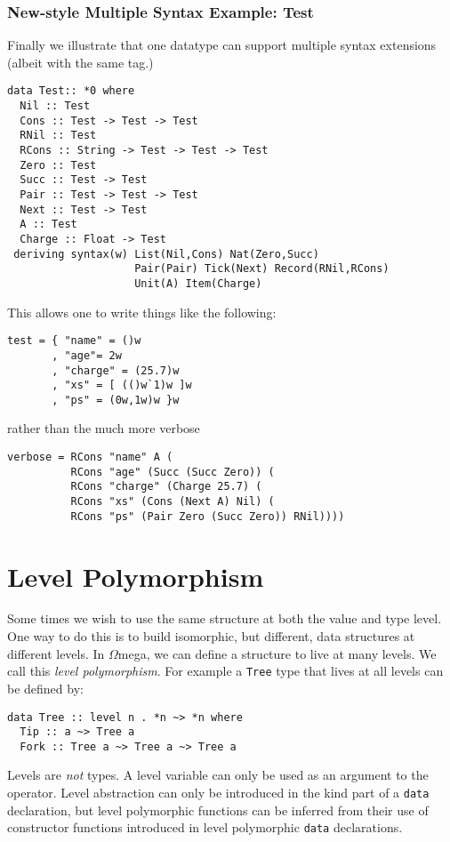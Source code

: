\documentclass[11pt,twoside]{article}
\newcommand{\om}{$\Omega$mega}
\begin{document}
\subsubsection{New-style Multiple Syntax Example: Test}

Finally we illustrate that one datatype can support multiple syntax extensions
(albeit with the same tag.)


\begin{verbatim}
data Test:: *0 where
  Nil :: Test
  Cons :: Test -> Test -> Test
  RNil :: Test
  RCons :: String -> Test -> Test -> Test
  Zero :: Test
  Succ :: Test -> Test
  Pair :: Test -> Test -> Test
  Next :: Test -> Test
  A :: Test
  Charge :: Float -> Test
 deriving syntax(w) List(Nil,Cons) Nat(Zero,Succ)
                    Pair(Pair) Tick(Next) Record(RNil,RCons)
                    Unit(A) Item(Charge)
\end{verbatim}
This allows one to write things like the following:

\begin{verbatim}
test = { "name" = ()w
       , "age"= 2w
       , "charge" = (25.7)w
       , "xs" = [ (()w`1)w ]w
       , "ps" = (0w,1w)w }w
\end{verbatim}
rather than the much more verbose
\begin{verbatim}
verbose = RCons "name" A (
          RCons "age" (Succ (Succ Zero)) (
          RCons "charge" (Charge 25.7) (
          RCons "xs" (Cons (Next A) Nil) (
          RCons "ps" (Pair Zero (Succ Zero)) RNil))))
\end{verbatim}




\section{Level Polymorphism}
Some times we wish to use the same structure at both the value and type level.
One way to do this is to build isomorphic, but different, data structures
at different levels. In \om, we can define a structure to live
at many levels. We call this {\it level polymorphism}. For example
a {\tt Tree} type that lives at all levels can be defined by:

\begin{verbatim}
data Tree :: level n . *n ~> *n where
  Tip :: a ~> Tree a
  Fork :: Tree a ~> Tree a ~> Tree a
\end{verbatim}
\noindent
Levels are {\it not} types. A level variable can only be used
as an argument to the {\tt *} operator. Level abstraction can only
be introduced in the kind part of a {\tt data} declaration, but level polymorphic
functions can be inferred from their use of constructor functions
introduced in level polymorphic {\tt data} declarations.
\end{document}
